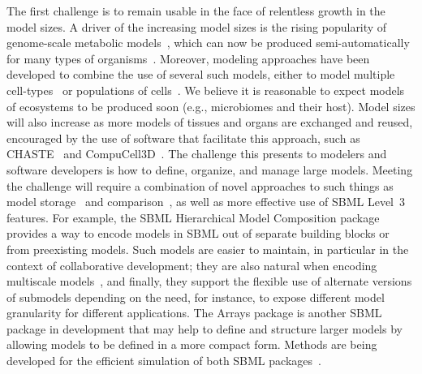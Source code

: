 \documentclass[]{draft-sbml-paper}
\begin{document}
The first challenge is to remain usable in the face of relentless growth in the model sizes.  A driver of the increasing model sizes is the rising popularity of genome-scale metabolic models~\citep{Bordbar2014a}, which can now be produced semi-automatically for many types of organisms~\citep{henry2010high, buchel2013path2models, Magnusdottir2017}. Moreover, modeling approaches have been developed to combine the use of several such models, either to model multiple cell-types~\citep{bordbar2011multi} or populations of cells~\citep{damiani2017popfba}. We believe it is reasonable to expect models of ecosystems to be produced soon (e.g., microbiomes and their host). Model sizes will also increase as more models of tissues and organs are exchanged and reused, encouraged by the use of software that facilitate this approach, such as CHASTE~\citep{mirams2013chaste} and CompuCell3D~\citep{swat2012multi}.  The challenge this presents to modelers and software developers is how to define, organize, and manage large models.  Meeting the challenge will require a combination of novel approaches to such things as model storage~\citep[e.g.,][]{Henkel2015combininga} and comparison~\citep[e.g.,][]{Scharm2016algorithm}, as well as more effective use of SBML Level~3 features.  For example, the SBML Hierarchical Model Composition package~\citep{Smith2015} provides a way to encode models in SBML out of separate building blocks or from preexisting models.  Such models are easier to maintain, in particular in the context of collaborative development; they are also natural when encoding multiscale models~\citep{chew2014multiscale}, and finally, they support the flexible use of alternate versions of submodels depending on the need, for instance, to expose different model granularity for different applications.  The Arrays package is another SBML package in development that may help to define and structure larger models by allowing models to be defined in a more compact form.  Methods are being developed for the efficient simulation of both SBML packages~\citep{watanabe2014hierarchical, watanabe2016efficient}.
\end{document}
